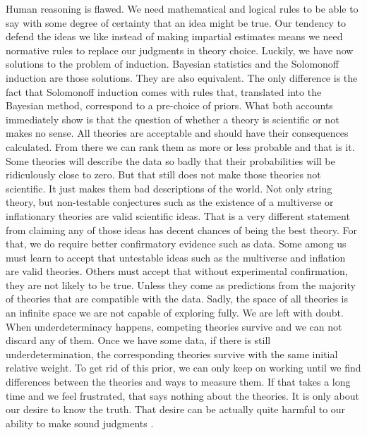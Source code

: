 \documentclass{article}
\begin{document}
	
	Human reasoning is flawed. We need mathematical and logical rules to be able to say with some degree of certainty that an idea might be true. Our tendency to defend the ideas we like instead of making impartial estimates means we need normative rules to replace our judgments in theory choice. Luckily, we have now solutions to the problem of induction. Bayesian statistics and the Solomonoff induction are those solutions. They are also equivalent. The only difference is the fact that Solomonoff induction comes with rules that, translated into the Bayesian method, correspond to a pre-choice of priors. What both accounts immediately show is that the question of whether a theory is scientific or not makes no sense. All theories are acceptable and should have their consequences calculated. From there we can rank them as more or less probable and that is it. Some theories will describe the data so badly that their probabilities will be ridiculously close to zero. But that still does not make those theories not scientific. It just makes them bad descriptions of the world. Not only string theory, but non-testable conjectures such as the existence of a multiverse or inflationary theories \cite{steinhardt14a} are valid scientific ideas. That is a very different statement from claiming any of those ideas has decent chances of being the best theory. For that, we do require better confirmatory evidence such as data. Some among us must learn to accept that untestable ideas such as the multiverse and inflation are valid theories. Others must accept that without experimental confirmation, they are not likely to be true. Unless they come as predictions from the majority of theories that are compatible with the data. Sadly, the space of all theories is an infinite space we are not capable of exploring fully. We are left with doubt. When underdeterminacy happens, competing theories survive and we can not discard any of them. Once we have some data, if there is still underdetermination, the corresponding theories survive with the same initial relative weight. To get rid of this prior, we can only keep on working until we find differences between the theories and ways to measure them. If that takes a long time and we feel frustrated, that says nothing about the theories. It is only about our desire to know the truth. That desire can be actually quite harmful to our ability to make sound judgments \cite{martins16a}.
	
	
	
\end{document}

